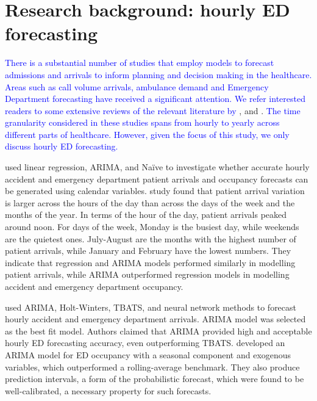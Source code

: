 \documentclass[]{elsarticle} %
\begin{document}
\hypertarget{lit}{%
\section{Research background: hourly ED forecasting}\label{lit}}

\textcolor{blue}{There is a substantial number of studies that employ models to forecast admissions and arrivals to inform planning and decision making in the healthcare. Areas such as call volume arrivals, ambulance demand and Emergency Department forecasting have received a significant attention. We refer interested readers to some extensive reviews of the relevant literature by} \citet{mingliterature2022}, \citet{gul2020review} and \citet{ibrahim2016modeling}. \textcolor{blue}{The time granularity considered in these studies spans from hourly to yearly across different parts of healthcare. However, given the focus of this study, we only discuss hourly ED forecasting.}

\citet{hertzum2017forecasting} used linear regression, ARIMA, and Naïve to
investigate whether accurate hourly accident and emergency department
patient arrivals and occupancy forecasts can be generated using calendar
variables. \citet{hertzum2017forecasting} study found that patient arrival
variation is larger across the hours of the day than across the days of
the week and the months of the year. In terms of the hour of the day,
patient arrivals peaked around noon. For days of the week, Monday is the
busiest day, while weekends are the quietest ones. July-August are the
months with the highest number of patient arrivals, while January and
February have the lowest numbers. They indicate that regression and
ARIMA models performed similarly in modelling patient arrivals, while
ARIMA outperformed regression models in modelling accident and emergency
department occupancy.

\citet{choudhury2020forecasting} used ARIMA, Holt-Winters, TBATS, and neural
network methods to forecast hourly accident and emergency department
arrivals. ARIMA model was selected as the best fit model. Authors
claimed that ARIMA provided high and acceptable hourly ED forecasting
accuracy, even outperforming TBATS. \citet{Cheng2021} developed an ARIMA model
for ED occupancy with a seasonal component and exogenous variables,
which outperformed a rolling-average benchmark. They also produce
prediction intervals, a form of the probabilistic forecast, which were
found to be well-calibrated, a necessary property for such forecasts.
\end{document}
